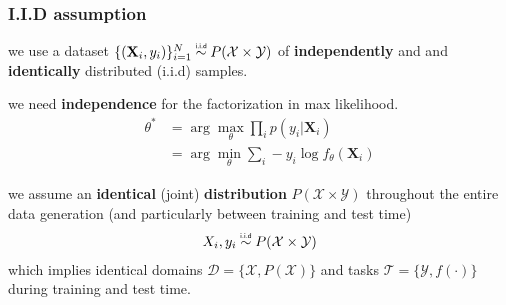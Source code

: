 \documentclass[11pt]{beamer}
\begin{document}
	
	\begin{frame}
		\frametitle{I.I.D assumption}
		
		we use a dataset $\{(\mathbf{X}_i,y_i)\}_{i=1}^N \iidsim P(\mathcal{X} \times \mathcal{Y})$ of \textbf{independently} and and \textbf{identically} distributed (i.i.d) samples.
		\vspace{1em}
		
		we need \textbf{independence} for the factorization in max likelihood.
		\begin{align*}
		\theta^\ast &= \arg\max_\theta \prod_{i} p(y_i \vert \mathbf{X}_i)  \\
		&= \arg\min_\theta \sum_{i} -y_i \log f_\theta(\mathbf{X}_i)
		\end{align*}
		
		\pause
		we assume an \textbf{identical} (joint) \textbf{distribution} $P(\mathcal{X} \times \mathcal{Y})$ throughout the entire data generation { \scriptsize (and particularly between training and test time) }
		\begin{align}
		X_i,y_i \iidsim P(\mathcal{X} \times \mathcal{Y})
		\end{align}
		which implies identical domains $\mathcal{D} = \{\mathcal{X}, P(\mathcal{X})\}$ and tasks $\mathcal{T} = \{\mathcal{Y}, f(\cdot)\}$ during training and test time.
		
	\end{frame}
\end{document}

